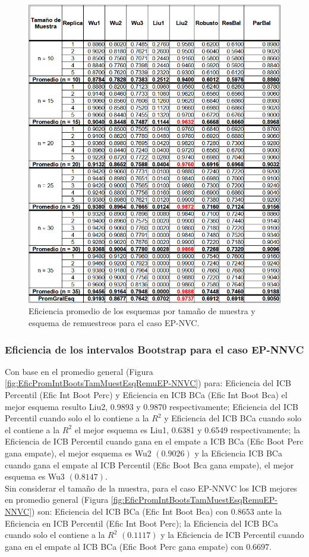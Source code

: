 \begin{figure}[H] 
	\centering 
	\includegraphics[width=0.70\linewidth]{img/EP_NVC_Efic_Esq.png} 
	\caption{Eficiencia promedio de los esquemas por tamaño de muestra y esquema de remuestreos para el caso EP-NVC.} 
	\label{fig:EficPromEsqTamMuesEsqRemuEP-NVC}
\end{figure}

\FloatBarrier

\subsubsection{Eficiencia de los intervalos Bootstrap para el caso EP-NNVC}
Con base en el promedio general (Figura \ref{fig:EficPromIntBootsTamMuestEsqRemuEP-NNVC}) para: Eficiencia del ICB Percentil (Efic Int Boot Perc) y Eficiencia en ICB BCa (Efic Int Boot Bca) el mejor esquema resulto Liu2, 0.9893 y 0.9870 respectivamente;
Eficiencia del ICB Percentil cuando solo el lo contiene a la $R^{2}$ y Eficiencia del ICB BCa cuando solo el contiene a la $R^{2}$ el mejor esquema es Liu1, 0.6381 y 0.6549 respectivamente; 
la Eficiencia de ICB Percentil cuando gana en el empate a ICB BCa (Efic Boot Perc gana empate), el mejor esquema es Wu2 $(0.9026)$ y la Eficiencia ICB BCa cuando gana el empate al ICB Percentil (Efic Boot Bca gana empate), el mejor esquema es Wu3 $(0.8147)$.\\


Sin considerar el tamaño de la muestra, para el caso EP-NNVC los ICB mejores en promedio general  (Figura \ref{fig:EficPromIntBootsTamMuestEsqRemuEP-NNVC}) son: Eficiencia del ICB BCa (Efic Int Boot Bca) con $0.8653$ ante la Eficiencia en ICB Percentil (Efic Int Boot Perc); la Eficiencia del ICB BCa cuando solo el contiene a la $R^{2}$ $(0.1117)$ y la Eficiencia de ICB Percentil cuando gana en el empate al ICB BCa (Efic Boot Perc gana empate) con $0.6697$.



